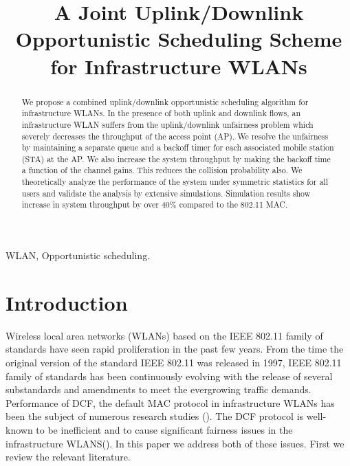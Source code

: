 \documentclass[10pt,conference]{IEEEtran}
\begin{document}
\title{A Joint Uplink/Downlink Opportunistic Scheduling Scheme for Infrastructure WLANs}
\author{ 

}
\maketitle
\begin{abstract}
We propose a combined uplink/downlink opportunistic scheduling algorithm for infrastructure WLANs.
In the presence of both uplink and downlink flows, an infrastructure WLAN suffers from the uplink/downlink unfairness problem which severely decreases the throughput of the access point (AP).
We resolve the unfairness by maintaining a separate queue and a backoff timer for each associated mobile station (STA) at the AP.
We also increase the system throughput by making the backoff time a function of the channel gains. This reduces the collision probability also.
We theoretically analyze the performance of the system under symmetric statistics for all users and validate the analysis by extensive simulations.
Simulation results show increase in system throughput by over $40\%$ compared to the 802.11 MAC.

\end{abstract}

\begin{keywords}
 WLAN, Opportunistic scheduling.
\end{keywords}

\section{Introduction}
\label{sec:Intro}
Wireless local area networks (WLANs) based on the IEEE 802.11 family of standards have seen rapid proliferation in the past few years. From the time the original version of the standard IEEE 802.11 was released in 1997, 
IEEE 802.11 family of standards has been continuously evolving with the release of several substandards and amendments to meet the evergrowing traffic demands.
Performance of DCF, the default MAC protocol in infrastructure WLANs has been the subject of numerous research studies (\cite{bianchi00,kumar05,kuriakose07}). 
The DCF protocol is well-known to be inefficient and to cause significant fairness issues in the infrastructure WLANS(\cite{Heusse03,kim2005downlink,nischal13}).
 In this paper we address both of these issues.
First we review the relevant literature.
\end{document}
